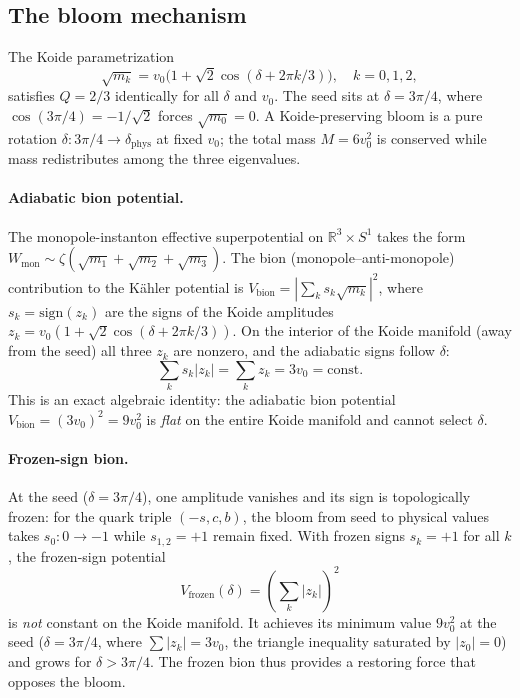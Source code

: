 \subsection{The bloom mechanism}

The Koide parametrization
\begin{equation*}
  \sqrt{m_k} = v_0\bigl(1 + \sqrt{2}\cos(\delta + 2\pi k/3)\bigr),
  \quad k = 0,1,2,
\end{equation*}
satisfies $Q = 2/3$ identically for all $\delta$ and $v_0$.
The seed sits at $\delta = 3\pi/4$, where
$\cos(3\pi/4) = -1/\sqrt{2}$ forces $\sqrt{m_0} = 0$.
A Koide-preserving bloom is a pure rotation
$\delta \colon 3\pi/4 \to \delta_{\mathrm{phys}}$ at fixed $v_0$;
the total mass $M = 6v_0^2$ is conserved while mass redistributes
among the three eigenvalues.

\paragraph{Adiabatic bion potential.}
The monopole-instanton effective superpotential on $\mathbb{R}^3\times S^1$
takes the form $W_{\mathrm{mon}} \sim \zeta(\sqrt{m_1}+\sqrt{m_2}+\sqrt{m_3})$.
The bion (monopole--anti-monopole) contribution to the
K\"{a}hler potential is $V_{\mathrm{bion}} = |\!\sum_k s_k\sqrt{m_k}|^2$,
where $s_k = \mathrm{sign}(z_k)$ are the signs of the
Koide amplitudes $z_k = v_0(1+\sqrt{2}\cos(\delta+2\pi k/3))$.
On the interior of the Koide manifold (away from the seed) all
three $z_k$ are nonzero, and the adiabatic signs follow $\delta$:
\begin{equation*}
  \sum_k s_k |z_k| = \sum_k z_k = 3v_0 = \mathrm{const}.
\end{equation*}
This is an exact algebraic identity: the adiabatic bion potential
$V_{\mathrm{bion}} = (3v_0)^2 = 9v_0^2$ is \emph{flat} on the entire Koide
manifold and cannot select $\delta$.

\paragraph{Frozen-sign bion.}
At the seed ($\delta = 3\pi/4$), one amplitude vanishes and its sign
is topologically frozen: for the quark triple $(-s,c,b)$, the
bloom from seed to physical values takes
$s_0: 0 \to -1$ while $s_{1,2} = +1$ remain fixed.
With frozen signs $s_k = +1$ for all $k$, the frozen-sign potential
\begin{equation*}
  V_{\mathrm{frozen}}(\delta) = \left(\sum_k |z_k|\right)^2
\end{equation*}
is \emph{not} constant on the Koide manifold.  It achieves its
minimum value $9v_0^2$ at the seed ($\delta = 3\pi/4$, where
$\sum |z_k| = 3v_0$, the triangle inequality saturated by
$|z_0| = 0$) and grows for $\delta > 3\pi/4$.
The frozen bion thus provides a restoring force that opposes the bloom.

